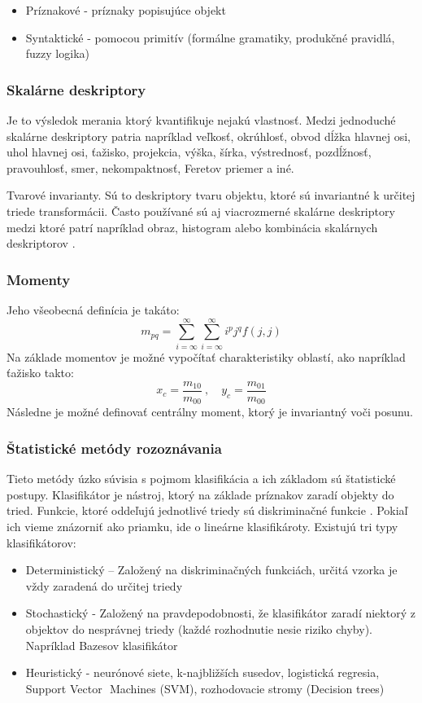 \begin{itemize}
\item Príznakové - príznaky popisujúce objekt 
\item Syntaktické - pomocou primitív (formálne gramatiky, produkčné pravidlá, fuzzy logika)
\end{itemize}

\subsubsection{Skalárne deskriptory}
Je to výsledok merania ktorý kvantifikuje nejakú vlastnosť. Medzi jednoduché skalárne deskriptory  patria napríklad veľkosť,  okrúhlosť, obvod dĺžka hlavnej osi, uhol hlavnej osi, ťažisko,  projekcia, výška, šírka, výstrednosť, pozdĺžnosť, pravouhlosť, smer, nekompaktnosť, Feretov priemer a iné. 

Tvarové invarianty. Sú to deskriptory tvaru objektu, ktoré sú invariantné k určitej triede transformácii.
Často používané sú aj viacrozmerné skalárne deskriptory medzi ktoré patrí napríklad obraz, histogram alebo kombinácia skalárnych deskriptorov  \cite{Analysis_and_Machine_Vision}. 

\subsubsection{Momenty}

Jeho všeobecná definícia je takáto:
$$m_{pq}=\sum_{i=\infty}^\infty \sum_{i=\infty}^\infty i^p j^q f(j,j)$$
Na základe momentov je možné vypočítať charakteristiky oblastí, ako napríklad ťažisko takto: 
$$x_c=\frac{m_{10}}{m_{00}}\ {,}\quad y_c=\frac{m_{01}}{m_{00}}$$
Následne je možné definovať centrálny moment, ktorý je invariantný voči posunu. 


\subsubsection{Štatistické metódy rozoznávania}
Tieto metódy úzko súvisia s pojmom klasifikácia a ich základom sú štatistické postupy. Klasifikátor je nástroj, ktorý na základe príznakov zaradí objekty do tried. Funkcie, ktoré oddeľujú jednotlivé triedy sú diskriminačné funkcie \cite{pocitacove_videnie_v_praxi}. Pokiaľ ich vieme znázorniť ako priamku, ide o lineárne klasifikároty. Existujú tri typy klasifikátorov: 

\begin{itemize}
\item Deterministický  – Založený na diskriminačných funkciách, určitá vzorka je vždy zaradená do určitej triedy 
\item Stochastický -  Založený na pravdepodobnosti, že klasifikátor zaradí niektorý z objektov do nesprávnej triedy (každé rozhodnutie nesie riziko chyby).  Napríklad Bazesov klasifikátor
\item Heuristický - neurónové siete, k-najbližších susedov, logistická regresia, Support Vector  Machines (SVM), rozhodovacie stromy (Decision trees) 
\end{itemize}

